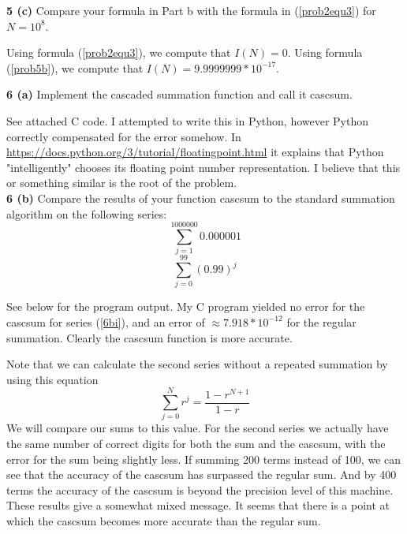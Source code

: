 \documentclass[12pt]{article}
\begin{document}
\hspace{-7 ex}\textbf{5 (c)} Compare your formula in Part b with the formula in (\ref{prob2equ3}) for $N = 10^8$. \bigbreak

	Using formula (\ref{prob2equ3}), we compute that $I(N) = 0$. Using formula (\ref{prob5b}), we compute that $I(N) = 9.9999999*10^{-17}$. \bigbreak


\hspace{-7 ex}\textbf{6 (a)} Implement the cascaded summation function and call it cascsum. \bigbreak

	See attached C code. I attempted to write this in Python, however Python correctly compensated for the error somehow. In \url{https://docs.python.org/3/tutorial/floatingpoint.html} it explains that Python "intelligently" chooses its floating point number representation. I believe that this or something similar is the root of the problem.\\

\hspace{-7 ex}\textbf{6 (b)} Compare the results of your function cascsum to the standard summation algorithm on the following series: \\
	\begin{equation}\label{6bi}
		\sum_{j=1}^{1000000}0.000001
	\end{equation}
	\begin{equation}\label{6bii}
		\sum_{j=0}^{99}(0.99)^j
	\end{equation}
	
	\bigbreak
	
	See below for the program output. \bigbreak
	My C program yielded no error for the cascsum for series (\ref{6bi}), and an error of $\approx 7.918*10^{-12}$ for the regular summation. Clearly the cascsum function is more accurate.\bigbreak
	
	Note that we can calculate the second series without a repeated summation by using this equation $$ \sum_{j=0}^{N}r^j = \frac{1-r^{N+1}}{1-r}$$ We will compare our sums to this value. For the second series we actually have the same number of correct digits for both the sum and the  cascsum, with the error for the sum being slightly less. If summing 200 terms instead of 100, we can see that the accuracy of the cascsum has surpassed the regular sum. And by 400 terms the accuracy of the cascsum is beyond the precision level of this machine. These results give a somewhat mixed message. It seems that there is a point at which the cascsum becomes more accurate than the regular sum.\\
	
\end{document}
